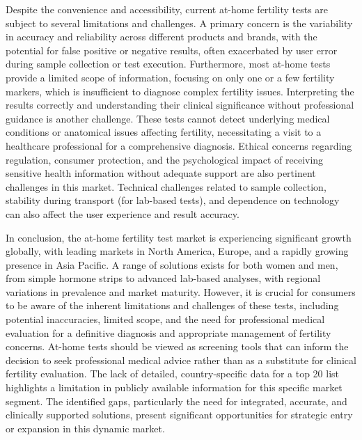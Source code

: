 \documentclass{article}
\begin{document}
Despite the convenience and accessibility, current at-home fertility tests are subject to several limitations and challenges. A primary concern is the variability in accuracy and reliability across different products and brands, with the potential for false positive or negative results, often exacerbated by user error during sample collection or test execution. Furthermore, most at-home tests provide a limited scope of information, focusing on only one or a few fertility markers, which is insufficient to diagnose complex fertility issues. Interpreting the results correctly and understanding their clinical significance without professional guidance is another challenge. These tests cannot detect underlying medical conditions or anatomical issues affecting fertility, necessitating a visit to a healthcare professional for a comprehensive diagnosis. Ethical concerns regarding regulation, consumer protection, and the psychological impact of receiving sensitive health information without adequate support are also pertinent challenges in this market. Technical challenges related to sample collection, stability during transport (for lab-based tests), and dependence on technology can also affect the user experience and result accuracy.

In conclusion, the at-home fertility test market is experiencing significant growth globally, with leading markets in North America, Europe, and a rapidly growing presence in Asia Pacific. A range of solutions exists for both women and men, from simple hormone strips to advanced lab-based analyses, with regional variations in prevalence and market maturity. However, it is crucial for consumers to be aware of the inherent limitations and challenges of these tests, including potential inaccuracies, limited scope, and the need for professional medical evaluation for a definitive diagnosis and appropriate management of fertility concerns. At-home tests should be viewed as screening tools that can inform the decision to seek professional medical advice rather than as a substitute for clinical fertility evaluation. The lack of detailed, country-specific data for a top 20 list highlights a limitation in publicly available information for this specific market segment. The identified gaps, particularly the need for integrated, accurate, and clinically supported solutions, present significant opportunities for strategic entry or expansion in this dynamic market.
\end{document}
